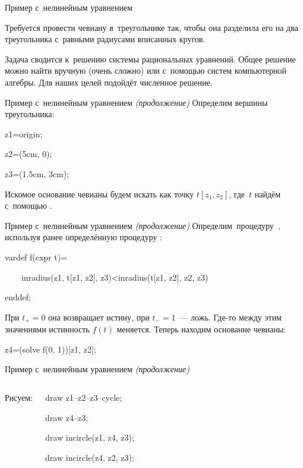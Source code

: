 \begin{frame}{Пример с~нелинейным уравнением}
\centerline{}

Требуется провести чевиану в~треугольнике так, чтобы она разделила его на два
треугольника с~равными радиусами вписанных кругов.

Задача сводится к~решению системы рациональных уравнений. Общее решение можно
найти вручную (очень сложно) или с~помощью систем компьютерной алгебры. Для
наших целей подойдёт численное решение.
\end{frame}

\begin{frame}{Пример с~нелинейным уравнением {\mdseries\itshape(продолжение)}}
Определим вершины треугольника:
\begin{programlisting}
z1=origin;\par
z2=(5cm, 0);\par
z3=(1.5cm, 3cm);
\end{programlisting}

Искомое основание чевианы будем искать как точку $t[z_1,z_2]$, где~$t$ найдём
с~помощью .
\end{frame}

\begin{frame}{Пример с~нелинейным уравнением {\mdseries\itshape(продолжение)}}
Определим~процедуру~, используя ранее определённую процедуру
:
\begin{programlisting}
vardef f(expr t)=\par
~~~~inradius(z1, t[z1, z2], z3)<inradius(t[z1, z2], z2, z3)\par
enddef;
\end{programlisting}

При $t_+=0$ она возвращает истину, при $t_-=1$~— ложь. Где-то между этим
значениями истинность $f(t)$ меняется. Теперь находим основание чевианы:
\begin{programlisting}
z4=(solve f(0, 1))[z1, z2];
\end{programlisting}
\end{frame}

\begin{frame}{Пример с~нелинейным уравнением {\mdseries\itshape(продолжение)}}
\begin{columns}
Рисуем:
\begin{programlisting}
draw z1--z2--z3--cycle;\par
draw z4--z3;\par
draw incircle(z1, z4, z3);\par
draw incircle(z4, z2, z3);\par
\end{programlisting}
\centerline{}
\end{columns}
\end{frame}
